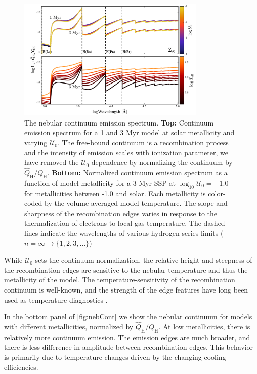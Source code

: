 \documentclass[twocolumn, tighten]{aastex61}
\newcommand{\Fig}[1]{\autoref{fig:#1}}
\newcommand{\logten}{\ensuremath{\log_{10}}}
\newcommand{\QH}{\ensuremath{Q_{\mathrm{H}}}}
\newcommand{\QHat}{\ensuremath{\hat{Q}_{\mathrm{H}}}}
\newcommand{\U}{\ensuremath{\mathcal{U}_{0}}}
\newcommand{\logU}{\ensuremath{\logten \mathcal{U}_0}}
\begin{document}
\begin{figure} %
 \begin{centering}
    \includegraphics[width=0.8\textwidth]{f10.pdf}
    \caption{The nebular continuum emission spectrum. \textbf{Top:} Continuum emission spectrum for a 1 and 3 Myr model at solar metallicity and varying \U{}. The free-bound continuum is a recombination process and the intensity of emission scales with ionization parameter, we have removed the \U{} dependence by normalizing the continuum by $\QHat/\QH$. \textbf{Bottom:} Normalized continuum emission spectrum as a function of model metallicity for a 3 Myr SSP at $\logU=-1.0$ for metallicities between -1.0 and solar. Each metallicity is color-coded by the volume averaged model temperature. The slope and sharpness of the recombination edges varies in response to the thermalization of electrons to local gas temperature. The dashed lines indicate the wavelengths of various hydrogen series limits ($n=\infty \rightarrow \{1,2,3,\ldots\}$)}
    \label{fig:nebCont}
 \end{centering}
\end{figure}

While \U{} sets the continuum normalization, the relative height and steepness of the recombination edges are sensitive to the nebular temperature and thus the metallicity of the model. The temperature-sensitivity of the recombination continuum is well-known, and the strength of the edge features have long been used as temperature diagnostics \citep[e.g.,][]{Peimbert67}.

In the bottom panel of \Fig{nebCont} we show the nebular continuum for models with different metallicities, normalized by \QHat{}/\QH{}. At low metallicities, there is relatively more continuum emission. The emission edges are much broader, and there is less difference in amplitude between recombination edges. This behavior is primarily due to temperature changes driven by the changing cooling efficiencies.
\end{document}
